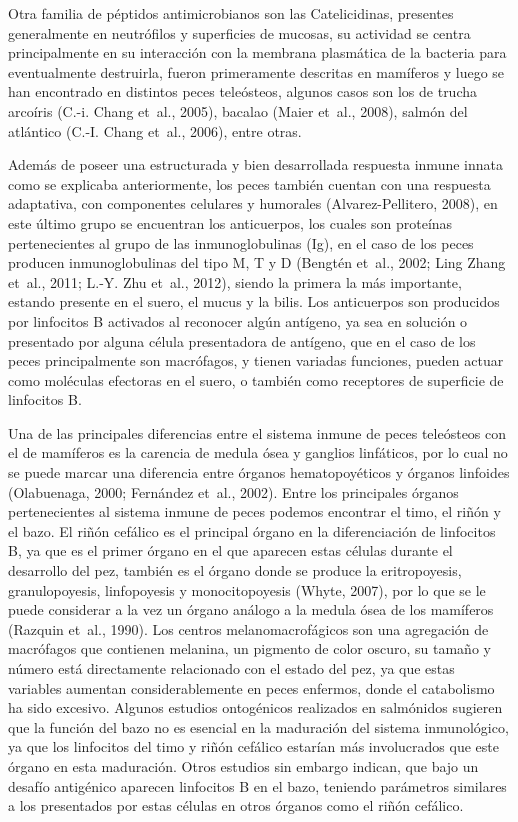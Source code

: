 \documentclass[12pt,letterpaper,oneside]{scrbook}
\begin{document}
Otra familia de péptidos antimicrobianos son las Catelicidinas,
presentes generalmente en neutrófilos y superficies de mucosas, su
actividad se centra principalmente en su interacción con la membrana
plasmática de la bacteria para eventualmente destruirla, fueron
primeramente descritas en mamíferos y luego se han encontrado en
distintos peces teleósteos, algunos casos son los de trucha arcoíris
(C.-i. Chang et~al., 2005), bacalao (Maier et~al., 2008), salmón del
atlántico (C.-I. Chang et~al., 2006), entre otras.

Además de poseer una estructurada y bien desarrollada respuesta inmune
innata como se explicaba anteriormente, los peces también cuentan con
una respuesta adaptativa, con componentes celulares y humorales
(Alvarez-Pellitero, 2008), en este último grupo se encuentran los
anticuerpos, los cuales son proteínas pertenecientes al grupo de las
inmunoglobulinas (Ig), en el caso de los peces producen inmunoglobulinas
del tipo M, T y D (Bengtén et~al., 2002; Ling Zhang et~al., 2011; L.-Y.
Zhu et~al., 2012), siendo la primera la más importante, estando presente
en el suero, el mucus y la bilis. Los anticuerpos son producidos por
linfocitos B activados al reconocer algún antígeno, ya sea en solución o
presentado por alguna célula presentadora de antígeno, que en el caso de
los peces principalmente son macrófagos, y tienen variadas funciones,
pueden actuar como moléculas efectoras en el suero, o también como
receptores de superficie de linfocitos B.

Una de las principales diferencias entre el sistema inmune de peces
teleósteos con el de mamíferos es la carencia de medula ósea y ganglios
linfáticos, por lo cual no se puede marcar una diferencia entre órganos
hematopoyéticos y órganos linfoides (Olabuenaga, 2000; Fernández et~al.,
2002). Entre los principales órganos pertenecientes al sistema inmune de
peces podemos encontrar el timo, el riñón y el bazo. El riñón cefálico
es el principal órgano en la diferenciación de linfocitos B, ya que es
el primer órgano en el que aparecen estas células durante el desarrollo
del pez, también es el órgano donde se produce la eritropoyesis,
granulopoyesis, linfopoyesis y monocitopoyesis (Whyte, 2007), por lo que
se le puede considerar a la vez un órgano análogo a la medula ósea de
los mamíferos (Razquin et~al., 1990). Los centros melanomacrofágicos son
una agregación de macrófagos que contienen melanina, un pigmento de
color oscuro, su tamaño y número está directamente relacionado con el
estado del pez, ya que estas variables aumentan considerablemente en
peces enfermos, donde el catabolismo ha sido excesivo. Algunos estudios
ontogénicos realizados en salmónidos sugieren que la función del bazo no
es esencial en la maduración del sistema inmunológico, ya que los
linfocitos del timo y riñón cefálico estarían más involucrados que este
órgano en esta maduración. Otros estudios sin embargo indican, que bajo
un desafío antigénico aparecen linfocitos B en el bazo, teniendo
parámetros similares a los presentados por estas células en otros
órganos como el riñón cefálico.
\end{document}
